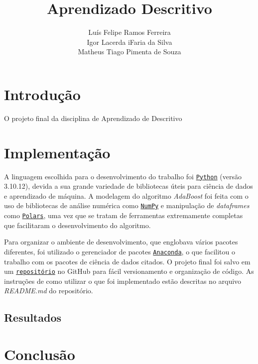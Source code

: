 \documentclass{article}
\title{Aprendizado Descritivo}
\author{Luís Felipe Ramos Ferreira \\  Igor Lacerda iFaria da Silva \\ Matheus Tiago Pimenta de Souza}
\begin{document}
\maketitle

\section{Introdução}

O projeto final da disciplina de Aprendizado de Descritivo

\section{Implementação}

A linguagem escolhida para o desenvolvimento do trabalho foi
\href{https://www.python.org/}{\texttt{Python}} (versão 3.10.12), devida a sua
grande variedade de bibliotecas úteis para ciência de dados e aprendizado de
máquina.
A modelagem do algoritmo \textit{AdaBoost} foi feita com o uso de bibliotecas
de análise numérica como \href{https://numpy.org/}{\texttt{NumPy}} e manipulação de \textit{dataframes} como
\href{https://pola.rs/}{\texttt{Polars}},
uma vez que se tratam de ferramentas extremamente completas que facilitaram o
desenvolvimento do algoritmo.

Para organizar o ambiente de desenvolvimento, que englobava vários pacotes
diferentes, foi utilizado o gerenciador de pacotes
\href{https://www.anaconda.com/}{\texttt{Anaconda}}, o que facilitou o trabalho
com os pacotes de ciência de dados citados. O projeto final foi salvo em um
\href{https://github.com/lframosferreira/projeto-ad}{\texttt{repositório}}
no GitHub para fácil versionamento e organização de código. As instruções de
como
utilizar o que foi implementado estão descritas no arquivo \textit{README.md}
do repositório.

\subsection{Resultados}

\section{Conclusão}

\newpage

\renewcommand{\refname}{Referências bibliográficas} 

\end{document}
